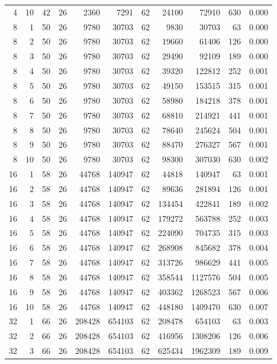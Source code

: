 \begin{table}[t]
\begin{tabularx}{\linewidth}{rrrrrrrrrrr}
4 & 10 & 42 & 26 & 2360 & 7291 & 62 & 24100 & 72910 & 630 & 0.000 \\
8 & 1 & 50 & 26 & 9780 & 30703 & 62 & 9830 & 30703 & 63 & 0.000 \\
8 & 2 & 50 & 26 & 9780 & 30703 & 62 & 19660 & 61406 & 126 & 0.000 \\
8 & 3 & 50 & 26 & 9780 & 30703 & 62 & 29490 & 92109 & 189 & 0.000 \\
8 & 4 & 50 & 26 & 9780 & 30703 & 62 & 39320 & 122812 & 252 & 0.001 \\
8 & 5 & 50 & 26 & 9780 & 30703 & 62 & 49150 & 153515 & 315 & 0.001 \\
8 & 6 & 50 & 26 & 9780 & 30703 & 62 & 58980 & 184218 & 378 & 0.001 \\
8 & 7 & 50 & 26 & 9780 & 30703 & 62 & 68810 & 214921 & 441 & 0.001 \\
8 & 8 & 50 & 26 & 9780 & 30703 & 62 & 78640 & 245624 & 504 & 0.001 \\
8 & 9 & 50 & 26 & 9780 & 30703 & 62 & 88470 & 276327 & 567 & 0.001 \\
8 & 10 & 50 & 26 & 9780 & 30703 & 62 & 98300 & 307030 & 630 & 0.002 \\
16 & 1 & 58 & 26 & 44768 & 140947 & 62 & 44818 & 140947 & 63 & 0.001 \\
16 & 2 & 58 & 26 & 44768 & 140947 & 62 & 89636 & 281894 & 126 & 0.001 \\
16 & 3 & 58 & 26 & 44768 & 140947 & 62 & 134454 & 422841 & 189 & 0.002 \\
16 & 4 & 58 & 26 & 44768 & 140947 & 62 & 179272 & 563788 & 252 & 0.003 \\
16 & 5 & 58 & 26 & 44768 & 140947 & 62 & 224090 & 704735 & 315 & 0.003 \\
16 & 6 & 58 & 26 & 44768 & 140947 & 62 & 268908 & 845682 & 378 & 0.004 \\
16 & 7 & 58 & 26 & 44768 & 140947 & 62 & 313726 & 986629 & 441 & 0.005 \\
16 & 8 & 58 & 26 & 44768 & 140947 & 62 & 358544 & 1127576 & 504 & 0.005 \\
16 & 9 & 58 & 26 & 44768 & 140947 & 62 & 403362 & 1268523 & 567 & 0.006 \\
16 & 10 & 58 & 26 & 44768 & 140947 & 62 & 448180 & 1409470 & 630 & 0.007 \\
32 & 1 & 66 & 26 & 208428 & 654103 & 62 & 208478 & 654103 & 63 & 0.003 \\
32 & 2 & 66 & 26 & 208428 & 654103 & 62 & 416956 & 1308206 & 126 & 0.006 \\
32 & 3 & 66 & 26 & 208428 & 654103 & 62 & 625434 & 1962309 & 189 & 0.009 \\

\end{tabularx}
\end{table}
